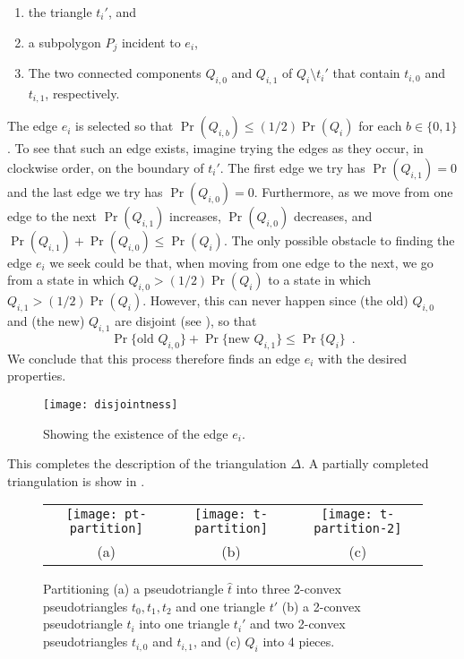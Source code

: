 \documentclass[lotsofwhite]{patmorin}
\newcommand{\z}[1]{{\hat{#1}}}
\begin{document}
\begin{enumerate}
\item the triangle $t_i'$, and
\item a subpolygon $P_j$ incident to $e_i$,
\item The two connected components $Q_{i,0}$
and $Q_{i,1}$ of $Q_i\setminus t_i'$ that contain $t_{i,0}$ and
$t_{i,1}$, respectively.
\end{enumerate}
The edge $e_i$ is selected so that $\Pr(Q_{i,b})\le (1/2)\Pr(Q_i)$ for
each $b\in\{0,1\}$.  To see that such an edge exists, imagine trying
the edges as they occur, in clockwise order, on the boundary of $t_i'$.
The first edge we try has $\Pr(Q_{i,1}) = 0$ and the last edge we try has
$\Pr(Q_{i,0}) = 0$.  Furthermore, as we move from one edge to the next
$\Pr(Q_{i,1})$ increases, $\Pr(Q_{i,0})$ decreases, and $\Pr(Q_{i,1})
+ \Pr(Q_{i,0}) \le \Pr(Q_i)$.  The only possible obstacle to finding
the edge $e_i$ we seek could be that, when moving from one edge to the
next, we go from a state in which $Q_{i,0} > (1/2)\Pr(Q_i)$ to a state
in which $Q_{i,1} > (1/2)\Pr(Q_i)$. However, this can never happen since
(the old) $Q_{i,0}$ and (the new) $Q_{i,1}$ are disjoint (see ), so that
\[
   \Pr\{\mbox{old $Q_{i,0}$}\} + \Pr\{\mbox{new $Q_{i,1}$}\} \le \Pr\{Q_i\}
   \enspace .
\]
We conclude that this process therefore finds an edge $e_i$ with the desired
properties.

\begin{figure}
  \begin{center}
    \texttt{[image: disjointness]}
  \end{center}
  \caption{Showing the existence of the edge $e_i$.}
\end{figure}

This completes the description of the triangulation $\Delta$.  A partially
completed triangulation is show in .

\begin{figure}
  \begin{center}
    \begin{tabular}{ccc}
      \texttt{[image: pt-partition]} & 
      \texttt{[image: t-partition]} &
      \texttt{[image: t-partition-2]} \\
      (a) & (b) & (c)
    \end{tabular}
  \end{center}
  \caption{Partitioning (a) a pseudotriangle $\z t$ into three 2-convex
pseudotriangles $t_0,t_1,t_2$ and one triangle $t'$ (b) a 2-convex
pseudotriangle $t_i$ into one triangle $t_i'$ and two 2-convex
pseudotriangles $t_{i,0}$ and $t_{i,1}$, and (c) $Q_i$ into 4 pieces.}
\end{figure}
\end{document}
